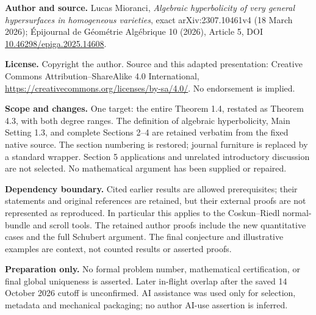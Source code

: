 \noindent\textbf{Author and source.} Lucas Mioranci, \emph{Algebraic hyperbolicity of very general hypersurfaces in homogeneous varieties}, exact arXiv:2307.10461v4 (18 March 2026); \'Epijournal de G\'eom\'etrie Alg\'ebrique 10 (2026), Article 5, DOI \href{https://doi.org/10.46298/epiga.2025.14608}{10.46298/epiga.2025.14608}.
\par\noindent\textbf{License.} Copyright the author. Source and this adapted presentation: Creative Commons Attribution--ShareAlike 4.0 International, \url{https://creativecommons.org/licenses/by-sa/4.0/}. No endorsement is implied.
\par\noindent\textbf{Scope and changes.} One target: the entire Theorem 1.4, restated as Theorem 4.3, with both degree ranges. The definition of algebraic hyperbolicity, Main Setting 1.3, and complete Sections 2--4 are retained verbatim from the fixed native source. The section numbering is restored; journal furniture is replaced by a standard wrapper. Section 5 applications and unrelated introductory discussion are not selected. No mathematical argument has been supplied or repaired.
\par\noindent\textbf{Dependency boundary.} Cited earlier results are allowed prerequisites; their statements and original references are retained, but their external proofs are not represented as reproduced. In particular this applies to the Coskun--Riedl normal-bundle and scroll tools. The retained author proofs include the new quantitative cases and the full Schubert argument. The final conjecture and illustrative examples are context, not counted results or asserted proofs.
\par\noindent\textbf{Preparation only.} No formal problem number, mathematical certification, or final global uniqueness is asserted. Later in-flight overlap after the saved 14 October 2026 cutoff is unconfirmed. AI assistance was used only for selection, metadata and mechanical packaging; no author AI-use assertion is inferred.
